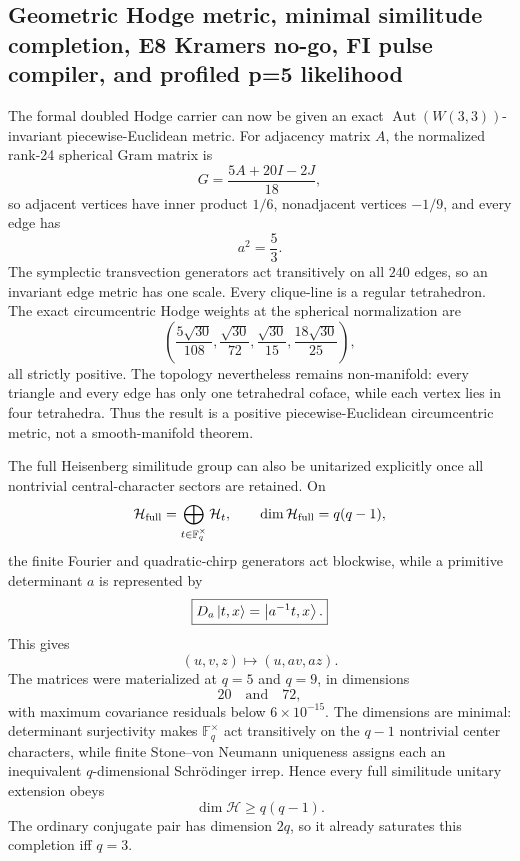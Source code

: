 \subsection*{Geometric Hodge metric, minimal similitude completion, E8 Kramers no-go, FI pulse compiler, and profiled p=5 likelihood}

The formal doubled Hodge carrier can now be given an exact
\(\operatorname{Aut}(W(3,3))\)-invariant piecewise-Euclidean metric.  For
adjacency matrix \(A\), the normalized rank-24 spherical Gram matrix is
\[
\boxed{
G=\frac{5A+20I-2J}{18},
}
\]
so adjacent vertices have inner product \(1/6\), nonadjacent vertices
\(-1/9\), and every edge has
\[
\boxed{a^2=\frac53}.
\]
The symplectic transvection generators act transitively on all \(240\)
edges, so an invariant edge metric has one scale.  Every clique-line is a
regular tetrahedron.  The exact circumcentric Hodge weights at the spherical
normalization are
\[
\boxed{
\left(
\frac{5\sqrt{30}}{108},
\frac{\sqrt{30}}{72},
\frac{\sqrt{30}}{15},
\frac{18\sqrt{30}}{25}
\right),
}
\]
all strictly positive.  The topology nevertheless remains non-manifold:
every triangle and every edge has only one tetrahedral coface, while each
vertex lies in four tetrahedra.  Thus the result is a positive
piecewise-Euclidean circumcentric metric, not a smooth-manifold theorem.

The full Heisenberg similitude group can also be unitarized explicitly once
all nontrivial central-character sectors are retained.  On
\[
\mathcal H_{\rm full}
=
\bigoplus_{t\in\mathbb F_q^\times}\mathcal H_t,
\qquad
\dim\mathcal H_{\rm full}=q(q-1),
\]
the finite Fourier and quadratic-chirp generators act blockwise, while a
primitive determinant \(a\) is represented by
\[
\boxed{
D_a\left|t,x\right\rangle=\left|a^{-1}t,x\right\rangle.
}
\]
This gives
\[
(u,v,z)\mapsto(u,av,az).
\]
The matrices were materialized at \(q=5\) and \(q=9\), in dimensions
\[
\boxed{20\quad\text{and}\quad72},
\]
with maximum covariance residuals below \(6\times10^{-15}\).  The
dimensions are minimal: determinant surjectivity makes
\(\mathbb F_q^\times\) act transitively on the \(q-1\) nontrivial center
characters, while finite Stone--von Neumann uniqueness assigns each an
inequivalent \(q\)-dimensional Schr\"odinger irrep.  Hence every full
similitude unitary extension obeys
\[
\boxed{\dim\mathcal H\ge q(q-1)}.
\]
The ordinary conjugate pair has dimension \(2q\), so it already saturates
this completion iff \(q=3\).

